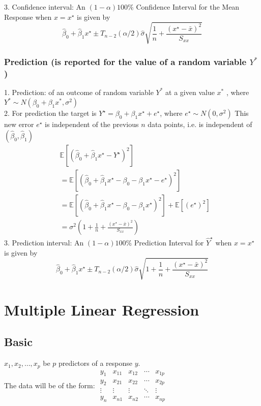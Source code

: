 \documentclass[11pt,a4paper]{article}
\begin{document}
3. Conﬁdence interval: An $(1-\alpha) 100 \%$ Confidence Interval for the Mean Response when $x=x^{\star}$ is given by
$$
\hat{\beta}_{0}+\hat{\beta}_{1} x^{\star} \pm T_{n-2}(\alpha / 2) \hat{\sigma} \sqrt{\frac{1}{n}+\frac{\left(x^{\star}-\bar{x}\right)^{2}}{S_{x x}}}
$$

\subsubsection{Prediction (is reported for the value of a random variable $Y^*$)}
1. Prediction: of an outcome of random variable $Y^*$ at a given value $x^*$ , where $Y^* \sim N( \beta_0 + \beta_1 x^* , \sigma^2 )$\\
2. For prediction the target is $Y^{\star}=\beta_{0}+\beta_{1} x^{\star}+e^{\star}$, where $e^{\star} \sim N\left(0, \sigma^{2}\right)$ This new error $e^{\star}$ is independent of the previous $n$ data points, i.e. is independent of $\left(\hat{\beta}_{0}, \hat{\beta}_{1}\right)$
$$
\begin{aligned}
&\mathbb{E}\left[\left(\hat{\beta}_{0}+\hat{\beta}_{1} x^{\star}-Y^{\star}\right)^{2}\right] \\
&=\mathbb{E}\left[\left(\hat{\beta}_{0}+\hat{\beta}_{1} x^{\star}-\beta_{0}-\beta_{1} x^{\star}-e^{\star}\right)^{2}\right] \\
&=\mathbb{E}\left[\left(\hat{\beta}_{0}+\hat{\beta}_{1} x^{\star}-\beta_{0}-\beta_{1} x^{\star}\right)^{2}\right]+\mathbb{E}\left[\left(e^{\star}\right)^{2}\right] \\
&=\sigma^{2}\left(1+\frac{1}{n}+\frac{\left(x^{\star}-\bar{x}\right)^{2}}{S_{x x}}\right)
\end{aligned}
$$
3. Prediction interval: An $(1-\alpha) 100 \%$ Prediction Interval for $\hat{Y}^{\star}$ when $x=x^{\star}$ is given by
$$
\hat{\beta}_{0}+\hat{\beta}_{1} x^{\star} \pm T_{n-2}(\alpha / 2) \hat{\sigma} \sqrt{1+\frac{1}{n}+\frac{\left(x^{\star}-\bar{x}\right)^{2}}{S_{x x}}}
$$

\section{Multiple Linear Regression}
\subsection{Basic}
$x_{1}, x_{2}, \ldots, x_{p}$ be $p$ predictors of a response $y$.\\
The data will be of the form:
$\begin{array}{ccccc}y_{1} & x_{11} & x_{12} & \cdots & x_{1 p} \\ y_{2} & x_{21} & x_{22} & \cdots & x_{2 p} \\ \vdots & \vdots & \vdots & \ddots & \vdots \\ y_{n} & x_{n 1} & x_{n 2} & \cdots & x_{n p}\end{array}$
\end{document}
